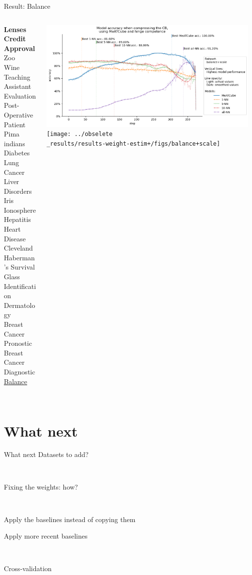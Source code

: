 \documentclass[]{beamer}
\begin{document}
\begin{frame}{Result: Balance}
    \begin{columns}
        \begin{column}{.3\textwidth}
            {\smaller\smaller\smaller
            \textbf{Lenses} \\
            \textbf{Credit Approval} \\
            Zoo \\
            Wine \\
            Teaching Assistant Evaluation \\
            Post-Operative Patient \\
            Pima indians Diabetes \\
            Lung Cancer \\
            Liver Disorders \\
            Iris \\
            Ionosphere \\
            Hepatitis \\
            Heart Disease Cleveland \\
            Haberman's Survival \\
            Glass Identification \\
            Dermatology \\
            Breast Cancer Pronostic \\
            Breast Cancer Diagnostic \\
            \underline{Balance}\\
            ~}
        \end{column}
        \begin{column}{.7\textwidth}
            \includegraphics[width=\textwidth]{../results-no-sim-tuning+/figs/balance+scale}
            \texttt{[image: ../obselete\\\_results/results-weight-estim+/figs/balance+scale]}
        \end{column}
    \end{columns}
\end{frame}


\section{What next}
\begin{frame}{What next}
    Datasets to add?

    ~

    Fixing the weights: how?

    ~

    Apply the baselines instead of copying them

    Apply more recent baselines

    ~

    Cross-validation
\end{frame}
\end{document}
